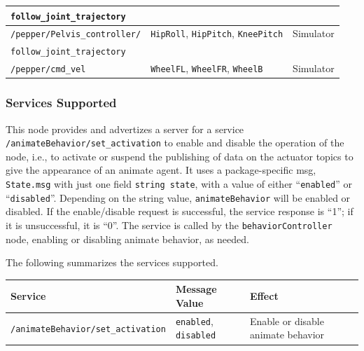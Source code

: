 \documentclass{CSSRforAfrica}
\begin{document}
\begin{center}
\begin{tabularx}{\linewidth}{| X | l| l|}
{\footnotesize \verb+follow_joint_trajectory+ }                        &   & \\ 
\hline
{\footnotesize \verb+/pepper/Pelvis_controller/+ }  & {\footnotesize \verb+HipRoll+, \verb+HipPitch+, \verb+KneePitch+ } & {\small  Simulator} \\ 
{\footnotesize \verb+follow_joint_trajectory+ }                        &   & \\ 
\hline
{\footnotesize \verb+/pepper/cmd_vel+ }  & {\footnotesize \verb+WheelFL+, \verb+WheelFR+, \verb+WheelB+ } & {\small  Simulator} \\ 
\hline
\end{tabularx}
\end{center}
 

\subsubsection*{Services Supported}
This node  provides and advertizes a server for a service {\small \verb+/animateBehavior/set_activation+} to enable and disable the operation of the node, i.e., to activate or suspend the publishing of data on the actuator topics to give the appearance of an animate agent.  It uses a package-specific msg, {\small \verb+State.msg+} with just one field  {\small \verb+string state+}, with a value of either ``{\small \verb+enabled+}'' or ``{\small \verb+disabled+}''. Depending on the string value, {\small \verb+animateBehavior+} will be enabled or disabled.  If the enable/disable request is successful, the service response is ``1''; if it is unsuccessful, it is ``0''.  
The service is called by  the {\small \verb+behaviorController+} node, enabling or disabling animate behavior, as needed.

The following summarizes the services supported.

\begin{center}
\begin{tabularx}{\linewidth}{| l | l | X|}
\hline 
{\small Service }                                                                                & {\small Message Value}    &  {\small Effect}       \\
\hline
{\footnotesize \verb+/animateBehavior/set_activation+ }  & {\footnotesize \verb+enabled+,   \verb+disabled+ } & {\small Enable or disable animate behavior} \\ 
\hline
\end{tabularx}
\end{center}
\end{document}
